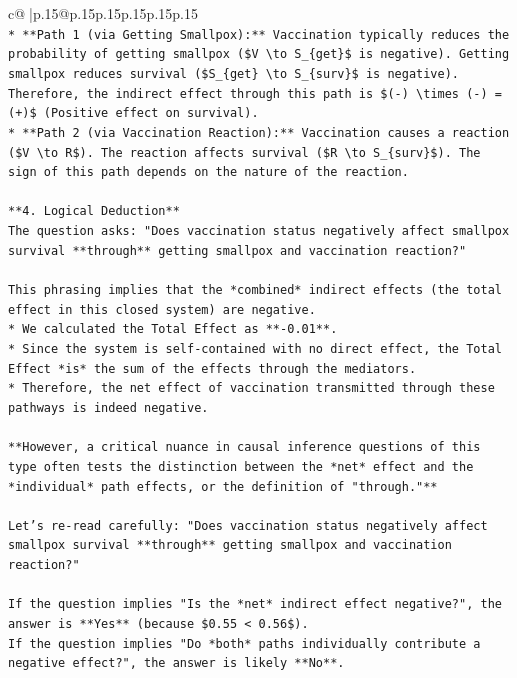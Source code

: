 \documentclass{article}
\begin{document}
{\begin{supertabular}{c@{$\;$}|p{.15\linewidth}@{}p{.15\linewidth}p{.15\linewidth}p{.15\linewidth}p{.15\linewidth}p{.15\linewidth}}
{{{\\ 
\texttt{*   **Path 1 (via Getting Smallpox):** Vaccination typically reduces the probability of getting smallpox (\$V \textbackslash{}to S\_\{get\}\$ is negative). Getting smallpox reduces survival (\$S\_\{get\} \textbackslash{}to S\_\{surv\}\$ is negative). Therefore, the indirect effect through this path is \$({-}) \textbackslash{}times ({-}) = (+)\$ (Positive effect on survival).} \\
\texttt{*   **Path 2 (via Vaccination Reaction):** Vaccination causes a reaction (\$V \textbackslash{}to R\$). The reaction affects survival (\$R \textbackslash{}to S\_\{surv\}\$). The sign of this path depends on the nature of the reaction.} \\
\\ 
\texttt{**4. Logical Deduction**} \\
\texttt{The question asks: "Does vaccination status negatively affect smallpox survival **through** getting smallpox and vaccination reaction?"} \\
\\ 
\texttt{This phrasing implies that the *combined* indirect effects (the total effect in this closed system) are negative.} \\
\texttt{*   We calculated the Total Effect as **{-}0.01**.} \\
\texttt{*   Since the system is self{-}contained with no direct effect, the Total Effect *is* the sum of the effects through the mediators.} \\
\texttt{*   Therefore, the net effect of vaccination transmitted through these pathways is indeed negative.} \\
\\ 
\texttt{**However, a critical nuance in causal inference questions of this type often tests the distinction between the *net* effect and the *individual* path effects, or the definition of "through."**} \\
\\ 
\texttt{Let's re{-}read carefully: "Does vaccination status negatively affect smallpox survival **through** getting smallpox and vaccination reaction?"} \\
\\ 
\texttt{If the question implies "Is the *net* indirect effect negative?", the answer is **Yes** (because \$0.55 < 0.56\$).} \\
\texttt{If the question implies "Do *both* paths individually contribute a negative effect?", the answer is likely **No**.} \\
}}}
\end{supertabular}}
\end{document}
